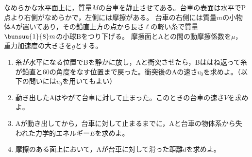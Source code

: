 \hakosyokika
\item
    \begin{mawarikomi}{180pt}{}
        なめらかな水平面上に，質量$M$の台車を静止させてある。台車の表面は水平でP点より右側がなめらかで，左側には摩擦がある。
        台車の右側には質量$m$の小物体Aが置いてあり，その鉛直上方の点から長さ$\ell $の軽い糸で質量$\bunsuu{1}{8}m$の小球Bをつり下げる。
        摩擦面とAとの間の動摩擦係数を$\mu $，重力加速度の大きさを$g$とする。
        \begin{enumerate}
            \item 糸が水平になる位置でBを静かに放し，Aと衝突させたら，Bははね返って糸が鉛直と60\Deg の角度をなす位置まで戻った。衝突後のAの速さ$v_0$を求めよ。（以下の問いには$v_0$を用いてもよい）
            \item 動き出したAはやがて台車に対して止まった。このときの台車の速さ$V$を求めよ。
            \item Aが動き出してから，台車に対して止まるまでに，Aと台車の物体系から失われた力学的エネルギー$E$を求めよ。
            \item 摩擦のある面上において，Aが台車に対して滑った距離$d$を求めよ。
        \end{enumerate}
    \end{mawarikomi}